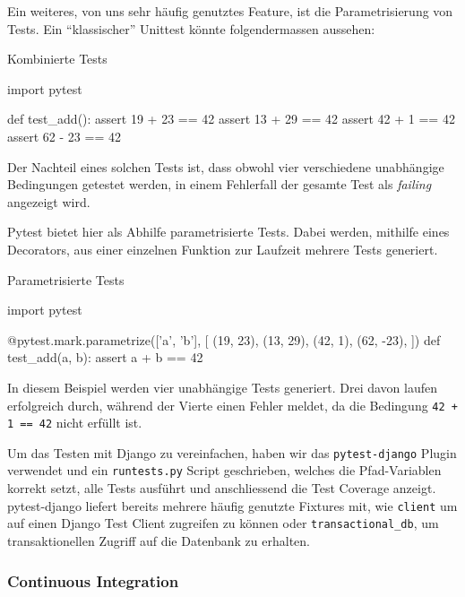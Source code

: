 Ein weiteres, von uns sehr häufig genutztes Feature, ist die Parametrisierung von
Tests. Ein \enquote{klassischer} Unittest könnte folgendermassen aussehen:

\begin{listing}
\caption{Kombinierte Tests}
\label{improvements:pytest-combined}
\begin{pythoncode}
import pytest

def test_add():
    assert 19 + 23 == 42
    assert 13 + 29 == 42
    assert 42 + 1 == 42
    assert 62 - 23 == 42
\end{pythoncode}
\end{listing}

Der Nachteil eines solchen Tests ist, dass obwohl vier verschiedene unabhängige
Bedingungen getestet werden, in einem Fehlerfall der gesamte Test als
\textit{failing} angezeigt wird.

Pytest bietet hier als Abhilfe parametrisierte Tests. Dabei werden, mithilfe eines
Decorators, aus einer einzelnen Funktion zur Laufzeit mehrere Tests generiert.

\begin{listing}
\caption{Parametrisierte Tests}
\label{improvements:pytest-parametrize}
\begin{pythoncode}
import pytest

@pytest.mark.parametrize(['a', 'b'], [
	(19, 23),
	(13, 29),
	(42, 1),
	(62, -23),
])
def test_add(a, b):
    assert a + b == 42
\end{pythoncode}
\end{listing}

In diesem Beispiel werden vier unabhängige Tests generiert. Drei davon laufen
erfolgreich durch, während der Vierte einen Fehler meldet, da die Bedingung
\texttt{42 + 1 == 42} nicht erfüllt ist.

Um das Testen mit Django zu vereinfachen, haben wir das \texttt{pytest-django}
Plugin verwendet und ein \texttt{runtests.py} Script geschrieben, welches die
Pfad-Variablen korrekt setzt, alle Tests ausführt und anschliessend die Test
Coverage anzeigt. pytest-django liefert bereits mehrere häufig genutzte Fixtures
mit, wie \zb \texttt{client} um auf einen Django Test Client zugreifen zu können
oder \texttt{transactional\_db}, um transaktionellen Zugriff auf die Datenbank
zu erhalten.

\subsubsection{Continuous Integration}

